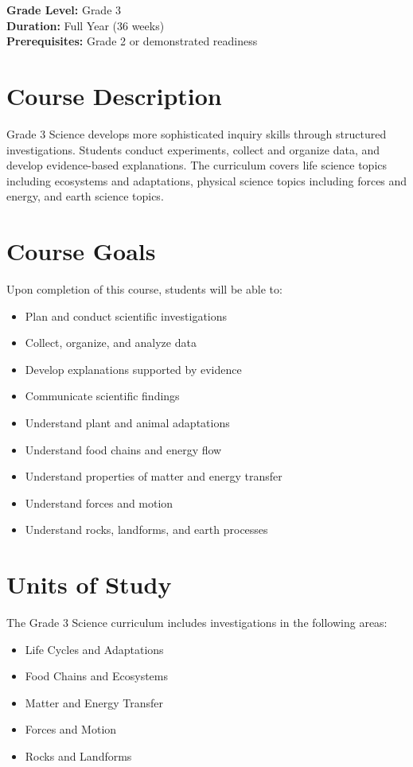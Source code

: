 \documentclass[11pt,letterpaper]{report}
\begin{document}
\textbf{Grade Level:} Grade 3\\
\textbf{Duration:} Full Year (36 weeks)\\
\textbf{Prerequisites:} Grade 2 or demonstrated readiness

\section{Course Description}

Grade 3 Science develops more sophisticated inquiry skills through structured investigations. Students conduct experiments, collect and organize data, and develop evidence-based explanations. The curriculum covers life science topics including ecosystems and adaptations, physical science topics including forces and energy, and earth science topics.

\section{Course Goals}

Upon completion of this course, students will be able to:

\begin{itemize}
    \item Plan and conduct scientific investigations
    \item Collect, organize, and analyze data
    \item Develop explanations supported by evidence
    \item Communicate scientific findings
    \item Understand plant and animal adaptations
    \item Understand food chains and energy flow
    \item Understand properties of matter and energy transfer
    \item Understand forces and motion
    \item Understand rocks, landforms, and earth processes
\end{itemize}

\section{Units of Study}

The Grade 3 Science curriculum includes investigations in the following areas:

\begin{itemize}
    \item Life Cycles and Adaptations
    \item Food Chains and Ecosystems
    \item Matter and Energy Transfer
    \item Forces and Motion
    \item Rocks and Landforms
\end{itemize}
\end{document}

